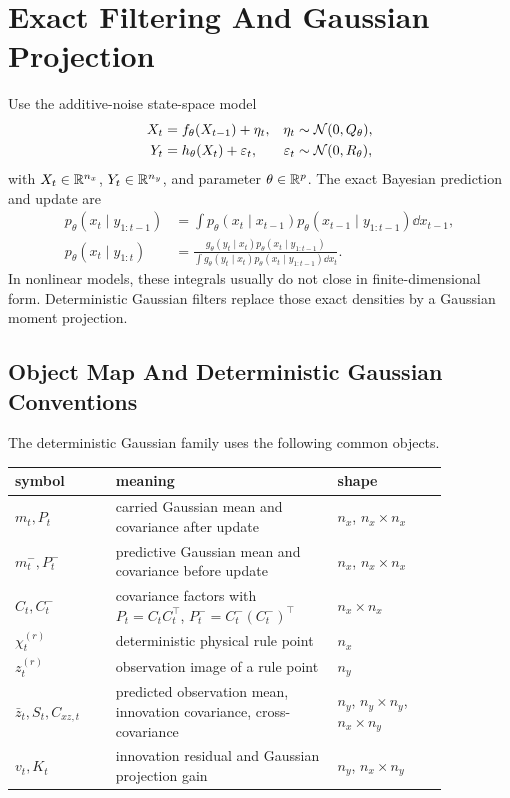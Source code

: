 \section{Exact Filtering And Gaussian Projection}
\label{sec:bf-hd-gq-exact-filtering}

Use the additive-noise state-space model
\begin{align}
  X_t &= f_\theta(X_{t-1})+\eta_t,
  &
  \eta_t&\sim\mathcal{N}(0,Q_\theta),
  \label{eq:bf-hd-gq-state-model}\\
  Y_t &= h_\theta(X_t)+\varepsilon_t,
  &
  \varepsilon_t&\sim\mathcal{N}(0,R_\theta),
  \label{eq:bf-hd-gq-observation-model}
\end{align}
with \(X_t\in\mathbb{R}^{n_x}\), \(Y_t\in\mathbb{R}^{n_y}\), and parameter
\(\theta\in\mathbb{R}^p\).  The exact Bayesian prediction and update are
\begin{align}
  p_\theta(x_t\mid y_{1:t-1})
  &=
  \int p_\theta(x_t\mid x_{t-1})
       p_\theta(x_{t-1}\mid y_{1:t-1})\dd x_{t-1},
  \label{eq:bf-hd-gq-exact-prediction}\\
  p_\theta(x_t\mid y_{1:t})
  &=
  \frac{
  g_\theta(y_t\mid x_t)
  p_\theta(x_t\mid y_{1:t-1})}
  {\int g_\theta(y_t\mid x_t)
  p_\theta(x_t\mid y_{1:t-1})\dd x_t}.
  \label{eq:bf-hd-gq-exact-update}
\end{align}
In nonlinear models, these integrals usually do not close in finite-dimensional
form.  Deterministic Gaussian filters replace those exact densities by a Gaussian
moment projection.

\subsection{Object Map And Deterministic Gaussian Conventions}
\label{subsec:bf-hd-gq-object-map}

The deterministic Gaussian family uses the following common objects.
\begin{center}
\small
\begin{tabular}{p{0.20\linewidth}p{0.44\linewidth}p{0.22\linewidth}}
\toprule
symbol & meaning & shape \\
\midrule
\(m_t,P_t\) & carried Gaussian mean and covariance after update & \(n_x\), \(n_x\times n_x\) \\
\(m_t^-,P_t^-\) & predictive Gaussian mean and covariance before update & \(n_x\), \(n_x\times n_x\) \\
\(C_t,C_t^-\) & covariance factors with \(P_t=C_tC_t^\top\), \(P_t^-=C_t^-(C_t^-)^\top\) & \(n_x\times n_x\) \\
\(\chi_t^{(r)}\) & deterministic physical rule point & \(n_x\) \\
\(z_t^{(r)}\) & observation image of a rule point & \(n_y\) \\
\(\bar z_t,S_t,C_{xz,t}\) & predicted observation mean, innovation covariance, cross-covariance & \(n_y\), \(n_y\times n_y\), \(n_x\times n_y\) \\
\(v_t,K_t\) & innovation residual and Gaussian projection gain & \(n_y\), \(n_x\times n_y\) \\
\bottomrule
\end{tabular}
\end{center}

